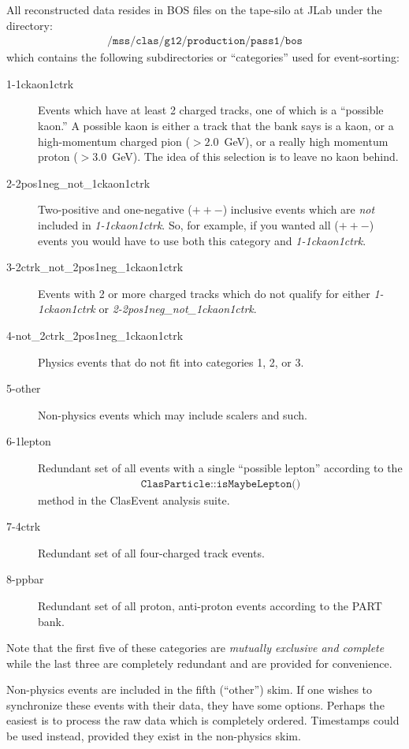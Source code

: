 All reconstructed data resides in BOS files on the tape-silo at JLab under the directory:
\begin{align}
\texttt{/mss/clas/g12/production/pass1/bos} \nonumber
\end{align}
which contains the following subdirectories or ``categories'' used for event-sorting:
\begin{description}
    \item[1-1ckaon1ctrk] Events which have at least 2 charged tracks, one of which is a ``possible kaon.'' A possible kaon is either a track that the  bank says is a kaon, or a high-momentum charged pion ($> 2.0$~GeV), or a really high momentum proton ($> 3.0$~GeV). The idea of this selection is to leave no kaon behind.
    \item[2-2pos1neg\_not\_1ckaon1ctrk] Two-positive and one-negative ($++-$) inclusive events which are \emph{not} included in \emph{1-1ckaon1ctrk}. So, for example, if you wanted all ($++-$) events you would have to use both this category and \emph{1-1ckaon1ctrk}.
    \item[3-2ctrk\_not\_2pos1neg\_1ckaon1ctrk] Events with 2 or more charged tracks which do not qualify for either \emph{1-1ckaon1ctrk} or \emph{2-2pos1neg\_not\_1ckaon1ctrk}.
    \item[4-not\_2ctrk\_2pos1neg\_1ckaon1ctrk] Physics events that do not fit into categories 1, 2, or 3.
    \item[5-other] Non-physics events which may include scalers and such.
    \item[6-1lepton] Redundant set of all events with a single ``possible lepton'' according to the
    \begin{align}
        \texttt{ClasParticle::isMaybeLepton()} \nonumber
    \end{align}
    method in the ClasEvent analysis suite.
    \item[7-4ctrk] Redundant set of all four-charged track events.
    \item[8-ppbar] Redundant set of all proton, anti-proton events according to the PART bank.
\end{description}
Note that the first five of these categories are \emph{mutually exclusive and complete} while the last three are completely redundant and are provided for convenience. \begin{v2}Non-physics events are included in the fifth (``other'') skim. If one wishes to synchronize these events with their data, they have some options. Perhaps the easiest is to process the raw data which is completely ordered. Timestamps could be used instead, provided they exist in the non-physics skim.\end{v2}

